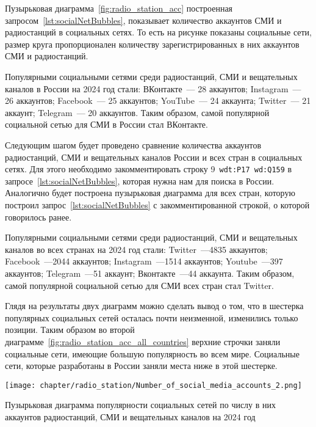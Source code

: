 Пузырьковая диаграмма~\ref{fig:radio_station_acc} построенная запросом~\ref{lst:socialNetBubbles}, показывает количество аккаунтов СМИ и радиостанций в социальных сетях. То есть на рисунке показаны социальные сети, размер круга пропорционален количеству зарегистрированных в них аккаунтов СМИ и радиостанций.

Популярными социальными сетями среди радиостанций, СМИ и вещательных каналов в России на 2024 год стали: 
ВКонтакте~--- 28 аккаунтов; 
Instagram~--- 26 аккаунтов; 
Facebook~--- 25 аккаунтов; 
YouTube~--- 24 аккаунта; 
Twitter~--- 21 аккаунт; 
Telegram~--- 20 аккаунтов. 
Таким образом, самой популярной социальной сетью для СМИ в России стал ВКонтакте.

Следующим шагом будет проведено сравнение количества аккаунтов радиостанций, СМИ и вещательных каналов России и всех стран в социальных сетях. Для этого необходимо закомментировать строку 9~\lstinline|wdt:P17 wd:Q159| в запросе~\ref{lst:socialNetBubbles}, которая нужна нам для поиска в России.  Аналогично будет построена пузырьковая диаграмма для всех стран, которую построил запрос~\ref{lst:socialNetBubbles} с закомментированной строкой, о которой говорилось ранее. 

Популярными социальными сетями среди радиостанций, СМИ и вещательных каналов во всех странах на 2024 год стали:
Twitter~---4835 аккаунтов;
Facebook~---2044 аккаунтов;
Instagram~---1514 аккаунтов;
Youtube~---397 аккаунтов;
Telegram~---51 аккаунт;
Вконтакте~---44 аккаунта.
Таким образом, самой популярной социальной сетью для СМИ всех стран стал Twitter.

Глядя на результаты двух диаграмм можно сделать вывод о том, что в шестерка популярных социальных сетей осталась почти неизменной, изменились только позиции. Таким образом во второй диаграмме~\ref{fig:radio_station_acc_all_countries}  верхние строчки заняли социальные сети, имеющие большую популярность во всем мире. Социальные сети, которые разработаны в России заняли места ниже в этой шестерке. 



\begin{marginfigure}[1\baselineskip]
{\texttt{[image: chapter/radio\_station/Number\_of\_social\_media\_accounts\_2.png]}}
\vspace{-7pt}
\caption{Пузырьковая диаграмма популярности социальных сетей по числу в них аккаунтов радиостанций, СМИ и вещательных каналов на 2024 год}%
\label{fig:radio_station_acc}
\end{marginfigure}

